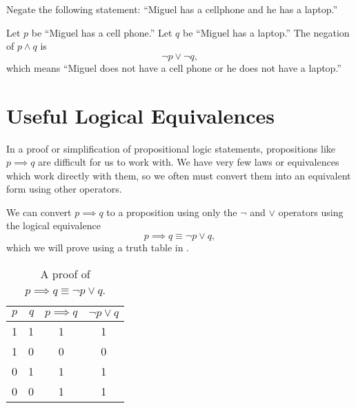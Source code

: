 \begin{ex}
  Negate the following statement:
  ``Miguel has a cellphone and he has a laptop.''
  \begin{sol}
    Let \(p\) be ``Miguel has a cell phone.''
    Let \(q\) be ``Miguel has a laptop.''
    The negation of $p \land q$ is
    \[ \neg p \lor \neg q, \]
    which means ``Miguel does not have a cell phone or he does not have a laptop.''
  \end{sol}
\end{ex}

\section{Useful Logical Equivalences}

In a proof or simplification of propositional logic statements, propositions like $p \implies q$
are difficult for us to work with.
We have very few laws or equivalences which work directly with them, so we often must convert them into an equivalent form using other operators.


We can convert $p\implies q$ to a proposition using only the $\neg$ and $\lor$ operators using the logical equivalence
\begin{equation}
  p \implies q \equiv \neg p \lor q,
\end{equation}
which we will prove using a truth table in .
\begin{table}[H]
  \centering
    \begin{tabular}{lrcc}
      \toprule
      $p$ & $q$ & $p \implies q$ & $\neg p \lor q$ \\ \midrule
      1 & 1 & 1 & 1 \\
      1 & 0 & 0 & 0 \\
      0 & 1 & 1 & 1 \\
      0 & 0 & 1 & 1 \\
      \bottomrule
    \end{tabular}
  \caption{A proof of \(p \implies q \equiv \neg p \lor q\).}
  \label{tab:conditionalproof}
\end{table}

